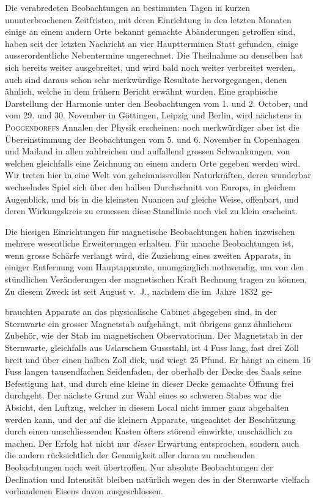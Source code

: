 Die verabredeten Beobachtungen an bestimmten Tagen in kurzen ununterbrochenen Zeitfristen, mit deren Einrichtung in den letzten Monaten einige an einem andern Orte bekannt gemachte Abänderungen getroffen sind, haben seit der letzten Nachricht an vier Hauptterminen Statt gefunden, einige ausserordentliche Nebentermine ungerechnet. Die Theilnahme an denselben hat sich bereits weiter ausgebreitet, und wird bald noch weiter verbreitet werden, auch sind daraus schon sehr merkwürdige Resultate hervorgegangen, denen ähnlich, welche in dem frühern Bericht erwähnt wurden. Eine graphische Darstellung der Harmonie unter den Beobachtungen vom 1. und 2. October, und vom 29. und 30. November in Göttingen, Leipzig und Berlin, wird nächstens in \textsc{Poggendorffs} Annalen der Physik erscheinen: noch merkwürdiger aber ist die Übereinstimmung der Beobachtungen vom 5. und 6. November in Copenhagen und Mailand in allen zahlreichen und auffallend grossen Schwankungen, von welchen gleichfalls eine Zeichnung an einem andern Orte gegeben werden wird. Wir treten hier in eine Welt von geheimnissvollen Naturkräften, deren wunderbar wechselndes Spiel sich über den halben Durchschnitt von Europa, in gleichem Augenblick, und bis in die kleinsten Nuancen auf gleiche Weise, offenbart, und deren Wirkungskreis zu ermessen diese Standlinie noch viel zu klein erscheint.

Die hiesigen Einrichtungen für magnetische Beobachtungen haben inzwischen mehrere wesentliche Erweiterungen erhalten. Für manche Beobachtungen ist, wenn grosse Schärfe verlangt wird, die Zuziehung eines zweiten Apparats, in einiger Entfernung vom Hauptapparate, unumgänglich nothwendig, um von den stündlichen Veränderungen der magnetischen Kraft Rechnung tragen zu können, Zu diesem Zweck ist seit August v.\ J., nachdem die im~Jahre~1832~ge-
\par{}
\par\clearpage
{}
\noindent brauchten Apparate an das physicalische Cabinet abgegeben sind, in der Sternwarte ein grosser Magnetstab aufgehängt, mit übrigens ganz ähnlichem Zubehör, wie der Stab im magnetischen Observatorium. Der Magnetstab in der Sternwarte, gleichfalls aus Uslarschem Gussstahl, ist 4 Fuss lang, fast drei Zoll breit und über einen halben Zoll dick, und wiegt 25 Pfund. Er hängt an einem 16 Fuss langen tausendfachen Seidenfaden, der oberhalb der Decke des Saals seine Befestigung hat, und durch eine kleine in dieser Decke gemachte Öffnung frei durchgeht. Der nächste Grund zur Wahl eines so schweren Stabes war die Absicht, den Luftzug, welcher in diesem Local nicht immer ganz abgehalten werden kann, und der auf die kleinern Apparate, ungeachtet der Beschützung durch einen umschliessenden Kasten öfters störend einwirkte, unschädlich zu machen. Der Erfolg hat nicht nur \textit{dieser} Erwartung entsprochen, sondern auch die andern rücksichtlich der Genauigkeit aller daran zu machenden Beobachtungen noch weit übertroffen. Nur absolute Beobachtungen der Declination und Intensität bleiben natürlich wegen des in der Sternwarte vielfach vorhandenen Eisens davon ausgeschlossen.

